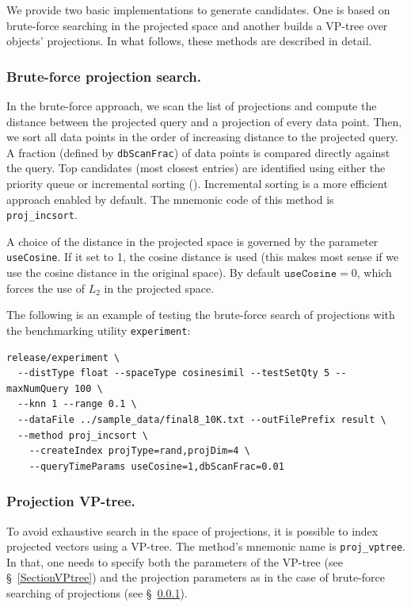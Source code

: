 \documentclass[runningheads,a4paper]{llncs}
\newcommand{\ttt}[1]{\texttt{#1}}
\begin{document}
{We provide two basic implementations to generate candidates.
One is based on brute-force searching in the projected space and another builds a VP-tree
over objects' projections.
In what follows, these methods are described in detail.

\subsubsection{Brute-force projection search.}\label{SectionProjBruteForce}
In the brute-force approach, we scan the list of projections and compute the distance
between the projected query and a projection of every data point.
Then, we sort all data points in the order of increasing distance to the projected query.
A fraction (defined by \ttt{dbScanFrac}) of data points is compared directly against the query.
Top candidates (most closest entries) are identified using either the priority queue
or incremental sorting (\cite{Chavez2008incsort}). 
Incremental sorting is a more efficient approach enabled by default.
The mnemonic code of this method is \ttt{proj\_incsort}.

A choice of the distance in the projected space is governed by the parameter \ttt{useCosine}.
If it set to 1, the cosine distance is used (this makes most sense if we use the cosine distance
in the original space). By default $\ttt{useCosine}=0$, which forces the use of $L_2$ in the projected space. 

The following is an example of testing the brute-force search of projections with the benchmarking utility \ttt{experiment}:
{
\footnotesize
\begin{verbatim}
release/experiment \
  --distType float --spaceType cosinesimil --testSetQty 5 --maxNumQuery 100 \
  --knn 1 --range 0.1 \
  --dataFile ../sample_data/final8_10K.txt --outFilePrefix result \
  --method proj_incsort \
    --createIndex projType=rand,projDim=4 \
    --queryTimeParams useCosine=1,dbScanFrac=0.01
\end{verbatim}
}

\subsubsection{Projection VP-tree.}\label{SectionProjVPTree}
To avoid exhaustive search in the space of projections, 
it is possible to index projected vectors using a VP-tree.
The method's mnemonic name is \ttt{proj\_vptree}.
In that, one needs to specify both the parameters of the VP-tree  (see \S~\ref{SectionVPtree})
and the projection parameters as in the case of brute-force searching of projections (see \S~\ref{SectionProjBruteForce}). 

}
\end{document}
